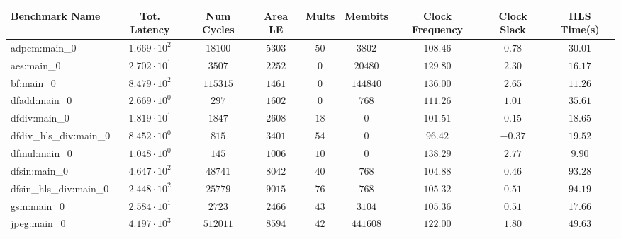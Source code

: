 \begin{tabular}{|l|c|c|c|c|c|c|c|c|}
\hline
Benchmark Name          & Tot. Latency           & Num Cycles & Area LE   & Mults   & Membits    & Clock Frequency & Clock Slack & HLS Time(s) \\
\hline
adpcm:main\_0           & $ 1.669 \cdot 10^{2} $ & $ 18100  $ & $ 5303  $ & $ 50  $ & $ 3802   $ & $ 108.46      $ & $ 0.78    $ & $ 30.01   $ \\
aes:main\_0             & $ 2.702 \cdot 10^{1} $ & $ 3507   $ & $ 2252  $ & $ 0   $ & $ 20480  $ & $ 129.80      $ & $ 2.30    $ & $ 16.17   $ \\
bf:main\_0              & $ 8.479 \cdot 10^{2} $ & $ 115315 $ & $ 1461  $ & $ 0   $ & $ 144840 $ & $ 136.00      $ & $ 2.65    $ & $ 11.26   $ \\
dfadd:main\_0           & $ 2.669 \cdot 10^{0} $ & $ 297    $ & $ 1602  $ & $ 0   $ & $ 768    $ & $ 111.26      $ & $ 1.01    $ & $ 35.61   $ \\
dfdiv:main\_0           & $ 1.819 \cdot 10^{1} $ & $ 1847   $ & $ 2608  $ & $ 18  $ & $ 0      $ & $ 101.51      $ & $ 0.15    $ & $ 18.65   $ \\
dfdiv\_hls\_div:main\_0 & $ 8.452 \cdot 10^{0} $ & $ 815    $ & $ 3401  $ & $ 54  $ & $ 0      $ & $ 96.42       $ & $ -0.37   $ & $ 19.52   $ \\
dfmul:main\_0           & $ 1.048 \cdot 10^{0} $ & $ 145    $ & $ 1006  $ & $ 10  $ & $ 0      $ & $ 138.29      $ & $ 2.77    $ & $ 9.90    $ \\
dfsin:main\_0           & $ 4.647 \cdot 10^{2} $ & $ 48741  $ & $ 8042  $ & $ 40  $ & $ 768    $ & $ 104.88      $ & $ 0.46    $ & $ 93.28   $ \\
dfsin\_hls\_div:main\_0 & $ 2.448 \cdot 10^{2} $ & $ 25779  $ & $ 9015  $ & $ 76  $ & $ 768    $ & $ 105.32      $ & $ 0.51    $ & $ 94.19   $ \\
gsm:main\_0             & $ 2.584 \cdot 10^{1} $ & $ 2723   $ & $ 2466  $ & $ 43  $ & $ 3104   $ & $ 105.36      $ & $ 0.51    $ & $ 17.66   $ \\
jpeg:main\_0            & $ 4.197 \cdot 10^{3} $ & $ 512011 $ & $ 8594  $ & $ 42  $ & $ 441608 $ & $ 122.00      $ & $ 1.80    $ & $ 49.63   $ \\

\end{tabular}
